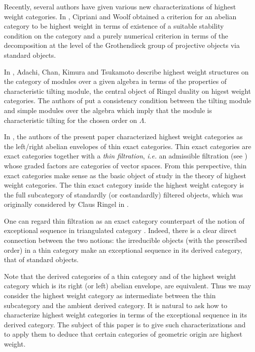 \documentclass[12pt,a4paper]{amsart}
\theoremstyle{definition}
\begin{document}
	Recently, several authors have given various new characterizations of highest weight categories. 
	In \cite{CirWoo}, Cipriani and Woolf obtained a criterion for an abelian category to be highest weight in terms of existence of a suitable stability condition on the category and a purely numerical criterion in terms of the decomposition at the level of the Grothendieck group of projective objects via standard objects. 
	
	In \cite{ACKT}, Adachi, Chan, Kimura and Tsukamoto describe highest weight structures on the category of modules over a given algebra in terms of the properties of characteristic tilting module, the central object of Ringel duality on higest weight categories. The authors of \cite{ACKT} put a consistency condition between the tilting module and simple modules over the algebra which imply that the module is characteristic tilting  for the chosen order on $\Lambda$.
	
	
	In \cite{BodBon4}, the authors of the present paper characterized highest weight categories as the left/right abelian envelopes of thin exact categories. Thin exact categories are exact categories together with a {\it thin filtration}, {\it i.e.} an admissible filtration (see \cite{BodBon4}) whose graded factors are categories of vector spaces. 
	From this perspective, thin exact categories make sense as the basic object of study in the theory of highest weight categories. The thin exact category inside the highest weight category is the full subcategory of standardly (or costandardly) filtered objects, which was originally considered by Claus Ringel  in \cite{Rin}.
	
	
	One can regard thin filtration as an exact category counterpart of the notion of exceptional sequence in triangulated category \cite{B}. Indeed, there is a clear direct connection between the two notions: the irreducible objects (with the prescribed order) in a thin category make an  exceptional sequence in its derived category, that of standard objects. 
	
	Note that the derived categories of a thin category and of the highest weight category which is its right (or left) abelian envelope, are equivalent. Thus we may consider the highest weight category as intermediate between the thin subcategory and the ambient derived category.
	It is natural to ask how to characterize highest weight categories in terms of the exceptional sequence in its derived category. The subject of this paper is to give such characterizations and to apply them to deduce that certain categories of geometric origin are highest weight.
	
\end{document}
